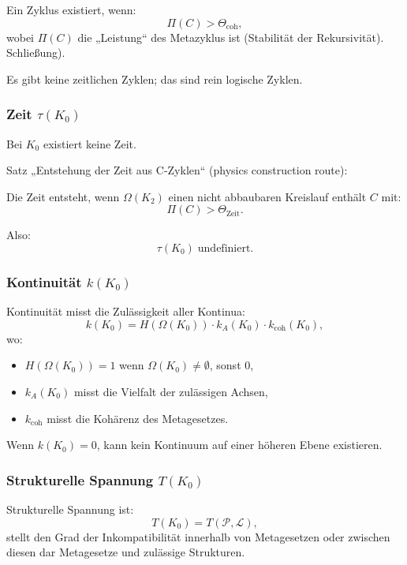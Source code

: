 Ein Zyklus existiert, wenn:
\[
\Pi(C) > \Theta_{\mathrm{coh}},
\]
wobei $\Pi(C)$ die „Leistung“ des Metazyklus ist (Stabilität der Rekursivität).
Schließung).

Es gibt keine zeitlichen Zyklen; das sind rein logische Zyklen.

\subsubsection{Zeit \texorpdfstring{$\tau(K_0)$}{\tau(K_0)}}

Bei $K_0$ existiert keine Zeit.

Satz „Entstehung der Zeit aus C-Zyklen“ (physics construction route):

Die Zeit entsteht, wenn $\Omega(K_2)$ einen nicht abbaubaren Kreislauf enthält
$C$ mit:
\[
\Pi(C) > \Theta_{\mathrm{Zeit}}.
\]

Also:
\[
\tau(K_0) \;\text{undefiniert}.
\]

\subsubsection{Kontinuität \texorpdfstring{$k(K_0)$}{k(K_0)}}

Kontinuität misst die Zulässigkeit aller Kontinua:
\[
k(K_0) =
H(\Omega(K_0)) \cdot
k_A(K_0) \cdot
k_{\mathrm{coh}}(K_0),
\]
wo:
\begin{itemize}
    \item $H(\Omega(K_0)) = 1$ wenn $\Omega(K_0)\neq\emptyset$, sonst $0$,
    \item $k_A(K_0)$ misst die Vielfalt der zulässigen Achsen,
    \item $k_{\mathrm{coh}}$ misst die Kohärenz des Metagesetzes.
\end{itemize}

Wenn $k(K_0)=0$, kann kein Kontinuum auf einer höheren Ebene existieren.

\subsubsection{Strukturelle Spannung \texorpdfstring{$T(K_0)$}{T(K_0)}}

Strukturelle Spannung ist:
\[
T(K_0) = T(\mathcal{P}, \mathcal{L}),
\]
stellt den Grad der Inkompatibilität innerhalb von Metagesetzen oder zwischen diesen dar
Metagesetze und zulässige Strukturen.

